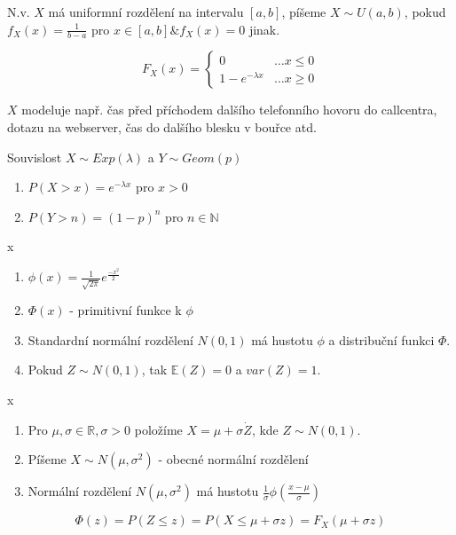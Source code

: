 \documentclass[../main.tex]{subfiles}
\begin{document}
\begin{definition}
    N.v. $X$ má uniformní rozdělení na intervalu $[a,b]$, píšeme 
    $X \sim U(a,b)$, pokud $f_X(x) = \frac{1}{b-a}$ pro $x \in [a,b] \& f_X(x) = 0$ jinak.
\end{definition}

\begin{definition}
    \[ F_X(x) =
    \begin{cases}
        0 & \dots x \leq 0\\
        1-e^{-\lambda x} & \dots x \geq 0
    \end{cases}
    \]
\end{definition}
\begin{remark}
    $X$ modeluje např. čas před příchodem dalšího telefonního hovoru do callcentra,
    dotazu na webserver,
    čas do dalšího blesku v bouřce atd.
\end{remark}

\begin{remark}
    Souvislost $X \sim Exp(\lambda)$ a  $Y \sim Geom(p)$
\begin{enumerate}
    \item $P(X > x) = e^{-\lambda x}$ pro $x > 0$
    \item $P(Y > n) = (1-p)^n$ pro $n \in \mathbb{N}$
\end{enumerate}
\end{remark}

\begin{definition}
    {\color{white} x}

    \begin{enumerate}
        \item $\phi(x) = \frac{1}{\sqrt{2\pi}}e^{\frac{-x^2}{2}}$
        \item $\Phi(x)$ - primitivní funkce k $\phi$
        \item Standardní normální rozdělení $N(0,1)$ má hustotu $\phi$ a distribuční funkci $\Phi$.
        \item Pokud $Z \sim N(0,1)$, tak $\mathbb{E}(Z) = 0$ a $var(Z) = 1$.
    \end{enumerate}
\end{definition}

\begin{definition}
    {\color{white} x}

    \begin{enumerate}
        \item Pro $\mu,\sigma \in \mathbb{R}, \sigma > 0$ položíme $X = \mu + \sigma \dot Z$, kde $Z \sim N(0,1)$.
        \item Píšeme $X \sim N(\mu, \sigma^2)$ - obecné normální rozdělení
        \item Normální rozdělení $N(\mu,\sigma^2)$ má hustotu $\frac{1}{\sigma}\phi \left( \frac{x-\mu}{\sigma} \right)$
    \end{enumerate}

    \[\Phi(z) = P(Z \leq z) = P(X \leq \mu + \sigma z) = F_X(\mu + \sigma z)\]
\end{definition}
\end{document}

